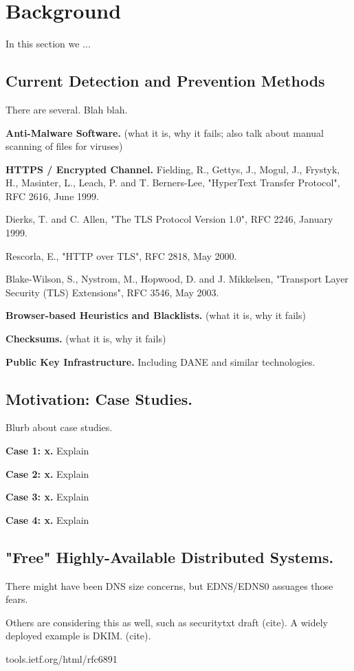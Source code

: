 \section{Background} \label{sec:background}

In this section we ...


\subsection{Current Detection and Prevention Methods}

There are several. Blah blah.

\textbf{Anti-Malware Software.}    (what it is, why it fails; also talk about
manual scanning of files for viruses)

\textbf{HTTPS / Encrypted Channel.}    Fielding, R., Gettys, J., Mogul, J.,
Frystyk, H., Masinter, L., Leach, P. and T. Berners-Lee, "HyperText Transfer
Protocol", RFC 2616, June 1999.

Dierks, T. and C. Allen, "The TLS Protocol Version 1.0", RFC 2246, January 1999.

Rescorla, E., "HTTP over TLS", RFC 2818, May 2000.

Blake-Wilson, S., Nystrom, M., Hopwood, D. and J. Mikkelsen, "Transport Layer
Security (TLS) Extensions", RFC 3546, May 2003.

\textbf{Browser-based Heuristics and Blacklists.}    (what it is, why it fails)

\textbf{Checksums.}    (what it is, why it fails)

\textbf{Public Key Infrastructure.}    Including DANE and similar technologies.

\subsection{Motivation: Case Studies.}

Blurb about case studies.

\textbf{Case 1: x.}    Explain

\textbf{Case 2: x.}    Explain

\textbf{Case 3: x.}    Explain

\textbf{Case 4: x.}    Explain

\subsection{"Free" Highly-Available Distributed Systems.}

There might have been DNS size concerns, but EDNS/EDNS0 assuages those fears.

Others are considering this as well, such as securitytxt draft (cite). A widely
deployed example is DKIM. (cite).

tools.ietf.org/html/rfc6891

